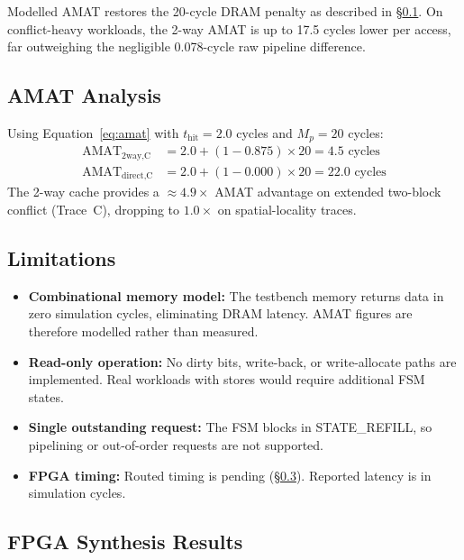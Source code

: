 \documentclass[conference]{IEEEtran}
\begin{document}
Modelled AMAT restores the 20-cycle DRAM penalty as described in
\S\ref{subsec:amat}.
On conflict-heavy workloads, the 2-way AMAT is up to 17.5 cycles lower
per access, far outweighing the negligible 0.078-cycle raw pipeline
difference.

\subsection{AMAT Analysis}
\label{subsec:amat}

Using Equation~\ref{eq:amat} with $t_{\text{hit}} = 2.0$ cycles and
$M_p = 20$ cycles:
\begin{align*}
  \text{AMAT}_{\text{2way,C}}   &= 2.0 + (1 - 0.875) \times 20 = 4.5 \text{ cycles} \\
  \text{AMAT}_{\text{direct,C}} &= 2.0 + (1 - 0.000) \times 20 = 22.0 \text{ cycles}
\end{align*}
The 2-way cache provides a $\approx\!4.9\times$ AMAT advantage on
extended two-block conflict (Trace~C), dropping to $1.0\times$ on
spatial-locality traces.

\subsection{Limitations}
\label{subsec:limits}

\begin{itemize}
  \item \textbf{Combinational memory model:} The testbench memory returns
        data in zero simulation cycles, eliminating DRAM latency.
        AMAT figures are therefore modelled rather than measured.
  \item \textbf{Read-only operation:} No dirty bits, write-back, or
        write-allocate paths are implemented.
        Real workloads with stores would require additional FSM states.
  \item \textbf{Single outstanding request:} The FSM blocks in
        STATE\_REFILL, so pipelining or out-of-order requests are
        not supported.
  \item \textbf{FPGA timing:} Routed timing is pending
        (\S\ref{subsec:fpga}). Reported latency is in simulation cycles.
\end{itemize}

\subsection{FPGA Synthesis Results}
\label{subsec:fpga}
\end{document}
